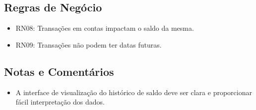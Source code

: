 \subsection*{Regras de Negócio}
\begin{addmargin}[1.5cm]{0cm}
    \begin{itemize}
        \item RN08: Transações em contas impactam o saldo da mesma.
        \item RN09: Transações não podem ter datas futuras.
    \end{itemize}
\end{addmargin}

\subsection*{Notas e Comentários}
\begin{addmargin}[1.5cm]{0cm}
    \begin{itemize}
        \item A interface de visualização do histórico de saldo deve ser clara e proporcionar fácil interpretação dos dados.
    \end{itemize}
\end{addmargin}
